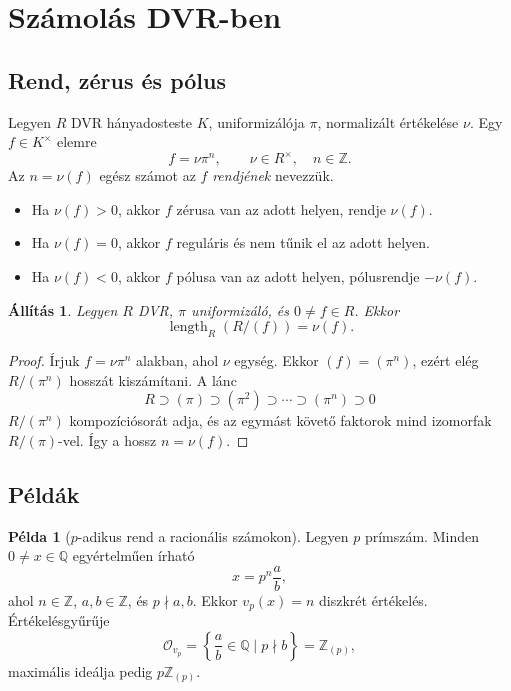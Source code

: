 \documentclass[11pt,a4paper]{article}
\newtheorem{allitas}[tetel]{Állítás}
\theoremstyle{definition}
\newtheorem{pelda}[tetel]{Példa}
\DeclareMathOperator{\length}{length}
\newcommand{\OO}{\mathcal O}
\newcommand{\ZZ}{\mathbb Z}
\begin{document}
\section{Számolás DVR-ben}

\subsection{Rend, zérus és pólus}

Legyen $R$ DVR hányadosteste $K$, uniformizálója $\pi$, normalizált
értékelése $
\nu$. Egy $f\in K^\times$ elemre
\[
  f=\nu\pi^n,\qquad \nu\in R^\times,\quad n\in\ZZ.
\]
Az $n=
\nu(f)$ egész számot az $f$ \emph{rendjének} nevezzük.

\begin{itemize}
  \item Ha $
\nu(f)>0$, akkor $f$ zérusa van az adott helyen, rendje
        $
\nu(f)$.
  \item Ha $
\nu(f)=0$, akkor $f$ reguláris és nem tűnik el az adott
        helyen.
  \item Ha $
\nu(f)<0$, akkor $f$ pólusa van az adott helyen, pólusrendje
        $-
\nu(f)$.
\end{itemize}

\begin{allitas}
Legyen $R$ DVR, $\pi$ uniformizáló, és $0\neq f\in R$. Ekkor
\[
  \length_R(R/(f))=
\nu(f).
\]
\end{allitas}

\begin{proof}
Írjuk $f=\nu\pi^n$ alakban, ahol $\nu$ egység. Ekkor
$(f)=(\pi^n)$, ezért elég $R/(\pi^n)$ hosszát kiszámítani. A lánc
\[
  R\supset(\pi)\supset(\pi^2)\supset\cdots\supset(\pi^n)\supset 0
\]
$R/(\pi^n)$ kompozíciósorát adja, és az egymást követő faktorok
mind izomorfak $R/(\pi)$-vel. Így a hossz $n=
\nu(f)$.
\end{proof}

\subsection{Példák}

\begin{pelda}[$p$-adikus rend a racionális számokon]
Legyen $p$ prímszám. Minden $0\neq x\in\mathbb Q$ egyértelműen írható
\[
  x=p^n\frac{a}{b},
\]
ahol $n\in\ZZ$, $a,b\in\ZZ$, és $p\nmid a,b$. Ekkor
$v_p(x)=n$ diszkrét értékelés. Értékelésgyűrűje
\[
  \OO_{v_p}=\left\{\frac{a}{b}\in\mathbb Q\mid p\nmid b\right\}
  =\ZZ_{(p)},
\]
maximális ideálja pedig $p\ZZ_{(p)}$.
\end{pelda}
\end{document}
